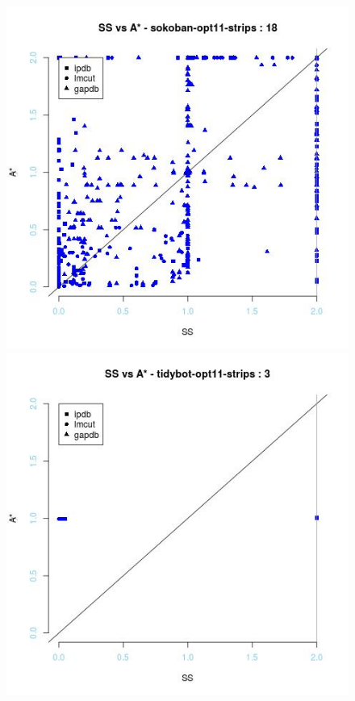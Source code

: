 \begin{figure}[!htb]
  \includegraphics[width=\linewidth]{images/sokoban-opt11-strips}
\endminipage\hfill
{}
  \includegraphics[width=\linewidth]{images/tidybot-opt11-strips}

\end{figure}
